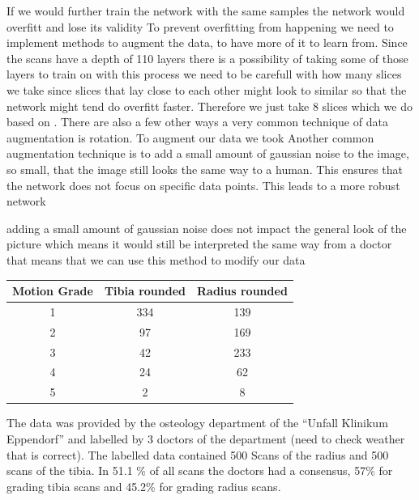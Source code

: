 \documentclass[
a4paper, 
12pt,
grayscalebody, %
abstract=on,
twoside, BCOR10mm, 12pt, DIV13,headinclude, footexclude, final, abstracton, openright
]{ibireprt}
\numberwithin{equation}{chapter}
\numberwithin{table}{chapter}
\numberwithin{figure}{chapter}
\numberwithin{algorithm}{chapter}
\numberwithin{example}{chapter}
\numberwithin{example}{chapter}
\begin{document}
 If we would further train the network with the same samples the network would overfitt and lose its validity  To prevent overfitting from happening we need to implement methods to augment the data, to have more of it to learn from. Since the scans have a depth of 110 layers there is a possibility of taking some of those layers to train on with this process we need to be carefull with how many slices we take since slices that lay close to each other might look to similar so that the network might tend do overfitt faster. Therefore we just take 8 slices which we do based on \cite{Walle2023}. There are also a few other ways a very common technique of data augmentation is rotation. To augment our data we took %
Another common augmentation technique is to add  a small amount of gaussian noise to the image, so small, that the image still looks the same way to a human. This ensures that the network does not focus on specific data points. This leads to a more robust network

adding a small amount of gaussian noise does not impact the general look of the picture which means it would still be interpreted the same way from a doctor that means that we can use this method to modify our data


\begin{table}[h]
	\centering
	\begin{tabular}{||c|c|c||}
		\hline
		 Motion Grade&  Tibia rounded& Radius rounded  	\\
		\hline
		\hline
		1 &  334&  139   \\
		\hline
		2 &  97&  169 	\\
		\hline
		3 &  42&  233   \\
		\hline
		4 &  24&  62   \\
		\hline
		5 &  2&  8 \\
		\hline
	\end{tabular}
\end{table}
The data was provided by the osteology department of the ``Unfall Klinikum Eppendorf'' and labelled by 3 doctors of the department (need to check weather that is correct). The labelled data contained 500 Scans of the radius and 500 scans of the tibia. In  51.1 \% of all scans the doctors had a consensus, 57\% for grading tibia scans and 45.2\% for grading radius scans. 
\end{document}
